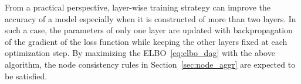 \documentclass[sigconf, anonymous, review]{acmart}
\theoremstyle{plain}
\theoremstyle{definition}
\theoremstyle{remark}
\begin{document}
From a practical perspective, layer-wise training strategy can improve the accuracy of a model especially when it is constructed of more than two layers. 
In such a case, the parameters of only one layer are updated with backpropagation of the gradient of the loss function while keeping the other layers fixed at each optimization step. 
By maximizing the ELBO~\eqref{eq:elbo_dag} with the above algorithm, the node consistency rules in Section~\ref{sec:node_aggr} are expected to be satisfied. 

\end{document}
